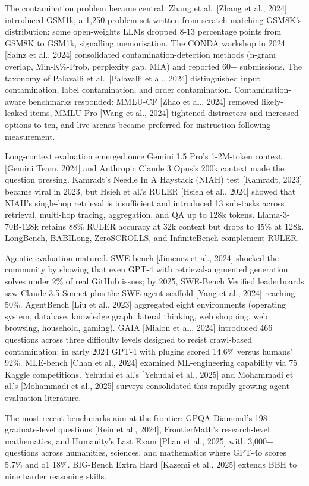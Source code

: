 The contamination problem became central. Zhang et al.~{[}Zhang et al., 2024{]} introduced GSM1k, a 1,250-problem set written from scratch matching GSM8K's distribution; some open-weights LLMs dropped 8-13 percentage points from GSM8K to GSM1k, signalling memorisation. The CONDA workshop in 2024 {[}Sainz et al., 2024{]} consolidated contamination-detection methods (n-gram overlap, Min-K\%-Prob, perplexity gap, MIA) and reported 60+ submissions. The taxonomy of Palavalli et al.~{[}Palavalli et al., 2024{]} distinguished input contamination, label contamination, and order contamination. Contamination-aware benchmarks responded: MMLU-CF {[}Zhao et al., 2024{]} removed likely-leaked items, MMLU-Pro {[}Wang et al., 2024{]} tightened distractors and increased options to ten, and live arenas became preferred for instruction-following measurement.

Long-context evaluation emerged once Gemini 1.5 Pro's 1-2M-token context {[}Gemini Team, 2024{]} and Anthropic Claude 3 Opus's 200k context made the question pressing. Kamradt's Needle In A Haystack (NIAH) test {[}Kamradt, 2023{]} became viral in 2023, but Hsieh et al.'s RULER {[}Hsieh et al., 2024{]} showed that NIAH's single-hop retrieval is insufficient and introduced 13 sub-tasks across retrieval, multi-hop tracing, aggregation, and QA up to 128k tokens. Llama-3-70B-128k retains 88\% RULER accuracy at 32k context but drops to 45\% at 128k. LongBench, BABILong, ZeroSCROLLS, and InfiniteBench complement RULER.

Agentic evaluation matured. SWE-bench {[}Jimenez et al., 2024{]} shocked the community by showing that even GPT-4 with retrieval-augmented generation solves under 2\% of real GitHub issues; by 2025, SWE-Bench Verified leaderboards saw Claude 3.5 Sonnet plus the SWE-agent scaffold {[}Yang et al., 2024{]} reaching 50\%. AgentBench {[}Liu et al., 2023{]} aggregated eight environments (operating system, database, knowledge graph, lateral thinking, web shopping, web browsing, household, gaming). GAIA {[}Mialon et al., 2024{]} introduced 466 questions across three difficulty levels designed to resist crawl-based contamination; in early 2024 GPT-4 with plugins scored 14.6\% versus humans' 92\%. MLE-bench {[}Chan et al., 2024{]} examined ML-engineering capability via 75 Kaggle competitions. Yehudai et al.'s {[}Yehudai et al., 2025{]} and Mohammadi et al.'s {[}Mohammadi et al., 2025{]} surveys consolidated this rapidly growing agent-evaluation literature.

The most recent benchmarks aim at the frontier: GPQA-Diamond's 198 graduate-level questions {[}Rein et al., 2024{]}, FrontierMath's research-level mathematics, and Humanity's Last Exam {[}Phan et al., 2025{]} with 3,000+ questions across humanities, sciences, and mathematics where GPT-4o scores 5.7\% and o1 18\%. BIG-Bench Extra Hard {[}Kazemi et al., 2025{]} extends BBH to nine harder reasoning skills.

